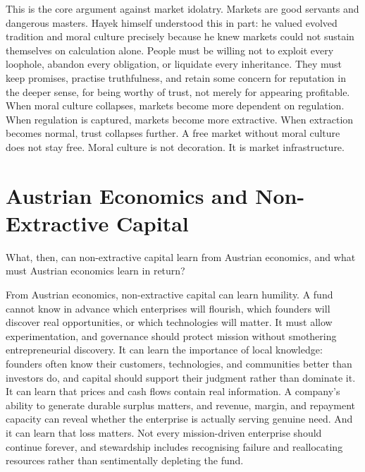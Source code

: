 \documentclass[11pt,a4paper,oneside]{book}
\begin{document}
This is the core argument against market idolatry. Markets are good servants and dangerous masters. Hayek himself understood this in part: he valued evolved tradition and moral culture precisely because he knew markets could not sustain themselves on calculation alone. People must be willing not to exploit every loophole, abandon every obligation, or liquidate every inheritance. They must keep promises, practise truthfulness, and retain some concern for reputation in the deeper sense, for being worthy of trust, not merely for appearing profitable. When moral culture collapses, markets become more dependent on regulation. When regulation is captured, markets become more extractive. When extraction becomes normal, trust collapses further. A free market without moral culture does not stay free. Moral culture is not decoration. It is market infrastructure.

\section*{Austrian Economics and Non-Extractive Capital}

What, then, can non-extractive capital learn from Austrian economics, and what must Austrian economics learn in return?

From Austrian economics, non-extractive capital can learn humility. A fund cannot know in advance which enterprises will flourish, which founders will discover real opportunities, or which technologies will matter. It must allow experimentation, and governance should protect mission without smothering entrepreneurial discovery. It can learn the importance of local knowledge: founders often know their customers, technologies, and communities better than investors do, and capital should support their judgment rather than dominate it. It can learn that prices and cash flows contain real information. A company's ability to generate durable surplus matters, and revenue, margin, and repayment capacity can reveal whether the enterprise is actually serving genuine need. And it can learn that loss matters. Not every mission-driven enterprise should continue forever, and stewardship includes recognising failure and reallocating resources rather than sentimentally depleting the fund.
\end{document}
